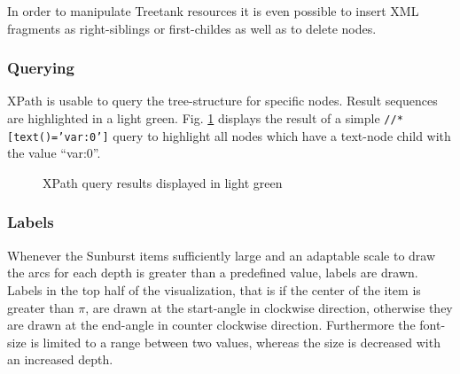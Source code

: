\begin{itemize}
In order to manipulate Treetank resources it is even possible to insert XML fragments as right-siblings or first-childes as well as to delete nodes.

\subsubsection{Querying}
XPath is usable to query the tree-structure for specific nodes. Result sequences are highlighted in a light green. Fig. \ref{fig:sunburstxpath} displays the result of a simple \texttt{//*[text()='var:0']} query to highlight all nodes which have a text-node child with the value ``var:0''.

\begin{figure}[tb]
\caption{\label{fig:sunburstxpath} XPath query results displayed in light green}
\end{figure}

\subsubsection{Labels}
Whenever the Sunburst items sufficiently large and an adaptable scale to draw the arcs for each depth is greater than a predefined value, labels are drawn. Labels in the top half of the visualization, that is if the center of the item is greater than $\pi$, are drawn at the start-angle in clockwise direction, otherwise they are drawn at the end-angle in counter clockwise direction. Furthermore the font-size is limited to a range between two values, whereas the size is decreased with an increased depth. 


\end{itemize}
